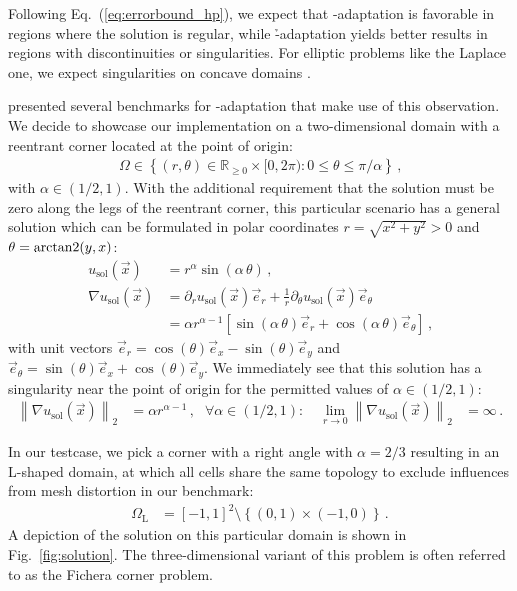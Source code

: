 Following Eq.~(\ref{eq:errorbound_hp}), we expect that \p-adaptation is favorable in regions where the solution is regular, while \h-adaptation yields better results in regions with discontinuities or singularities. For elliptic problems like the Laplace one, we expect singularities on concave domains \parencite[Sec.~5.5]{brenner2008}.

\textcite{mitchell2014} presented several benchmarks for \hp-\linebreak{}adaptation that make use of this observation. We decide to showcase our implementation on a two-dimensional domain with a reentrant corner located at the point of origin:
\begin{align}
\Omega \in \left\{ (r,\theta) \in \mathbb{R}_{\geq 0} \times [0, 2 \pi) : 0 \leq \theta \leq \pi/\alpha \right\} \,\text{,}
\end{align}
with $\alpha \in \left(1/2, 1\right)$. With the additional requirement that the solution must be zero along the legs of the reentrant corner, this particular scenario has a general solution which can be formulated in polar coordinates $r = \sqrt{x^2 + y^2} > 0$ and $\theta = \operatorname{arctan2}(y,x)$:
\begin{align}
\label{eq:ficherasolution} u_\text{sol}(\vec{x}) &= r^\alpha \sin(\alpha \, \theta) \,\text{,} \\
\nabla u_\text{sol}(\vec{x}) &= \partial_r u_\text{sol}(\vec{x}) \vec{e}_r + \frac{1}{r} \partial_\theta u_\text{sol}(\vec{x}) \vec{e}_\theta \\
&= \alpha r^{\alpha - 1} \left[ \sin(\alpha \, \theta) \vec{e}_r + \cos(\alpha \, \theta) \vec{e}_\theta \right] \,\text{,}
\end{align}
with unit vectors \(\vec{e}_r = \cos(\theta) \vec{e}_x - \sin(\theta) \vec{e}_y\) and \(\vec{e}_\theta = \sin(\theta) \vec{e}_x + \cos(\theta) \vec{e}_y\). We immediately see that this solution has a singularity near the point of origin for the permitted values of $\alpha \in \left(1/2, 1\right)$:
\begin{align}
\left\| \nabla u_\text{sol}(\vec{x}) \right\|_{2} &= \alpha r^{\alpha - 1} \,\text{,} & \forall \alpha \in \left(1/2, 1\right) : \quad \lim\limits_{r \rightarrow 0} \left\| \nabla u_\text{sol}(\vec{x}) \right\|_{2} &= \infty \,\text{.}
\end{align}

In our testcase, we pick a corner with a right angle with $\alpha = 2/3$ resulting in an L-shaped domain, at which all cells share the same topology to exclude influences from mesh distortion in our benchmark:
\begin{align}
\label{eq:Ldomain} \Omega_\text{L} &= \left[-1,1\right]^2 \setminus \left\{ \left(0,1\right) \times \left(-1, 0\right) \right\} \,\text{.}
\end{align}
A depiction of the solution on this particular domain is shown in Fig.~\ref{fig:solution}. The three-dimensional variant of this problem is often referred to as the Fichera corner problem.

